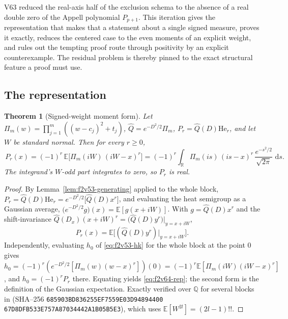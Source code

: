 \documentclass[11pt]{article}
\newtheorem{theorem}{Theorem}[section]
\theoremstyle{definition}
\theoremstyle{remark}
\newcommand{\dd}{\,\mathrm d}
\begin{document}
V63 reduced the real-axis half of the exclusion schema to the absence of
a real double zero of the Appell polynomial \(P_{p+1}\).  This iteration
gives the representation that makes that a statement about a single
signed measure, proves it exactly, reduces the centered case to the even
moments of an explicit weight, and rules out the tempting proof route
through positivity by an explicit counterexample.  The residual problem
is thereby pinned to the exact structural feature a proof must use.

\subsection{The representation}

\begin{theorem}[Signed-weight moment form]
\label{thm:f2v64-rep}
Let \(\Pi_m(w)=\prod_{j=1}^m((w-c_j)^2+t_j)\), \(\widehat Q=e^{-D^2/2}\Pi_m\),
\(P_r=\widehat Q(D)\mathrm{He}_r\), and let \(W\) be standard normal.
Then for every \(r\ge0\),
\begin{equation}
 \boxed{\,P_r(x)=(-1)^r\,\mathbb E\bigl[\Pi_m(iW)\,(iW-x)^r\bigr]
 =(-1)^r\int_{\mathbb R}\Pi_m(is)\,(is-x)^r\,\frac{e^{-s^2/2}}{\sqrt{2\pi}}\,\dd s.}
 \label{eq:f2v64-rep}
\end{equation}
The integrand's \(W\)-odd part integrates to zero, so \(P_r\) is real.
\end{theorem}

\begin{proof}
By Lemma~\ref{lem:f2v53-generating} applied to the whole block,
\(P_r=\widehat Q(D)\mathrm{He}_r=e^{-D^2/2}\bigl[\widehat Q(D)x^r\bigr]\),
and evaluating the heat semigroup as a Gaussian average,
\(\bigl(e^{-D^2/2}g\bigr)(x)=\mathbb E[g(x+iW)]\).  With
\(g=\widehat Q(D)x^r\) and the shift-invariance
\(\widehat Q(D_x)(x+iW)^r=\bigl(\widehat Q(D)y^r\bigr)|_{y=x+iW}\),
\[
 P_r(x)=\mathbb E\bigl[(\widehat Q(D)y^r)|_{y=x+iW}\bigr].
\]
Independently, evaluating \(h_0\) of \eqref{eq:f2v53-hk} for the whole
block at the point \(0\) gives
\(h_0=(-1)^r(e^{-D^2/2}[\Pi_m(w)(w-x)^r])(0)
 =(-1)^r\mathbb E[\Pi_m(iW)(iW-x)^r]\), and \(h_0=(-1)^rP_r\) there.
Equating yields \eqref{eq:f2v64-rep}; the second form is the definition
of the Gaussian expectation.  Exactly verified over \(\mathbb Q\) for
several blocks in
(SHA--256 \texttt{685903BD836255EF7559E03D94894400}\allowbreak
\texttt{67D8DFB533E757A87034442A1B05B5E3}), which uses
\(\mathbb E[W^{2l}]=(2l-1)!!\).
\end{proof}
\end{document}
